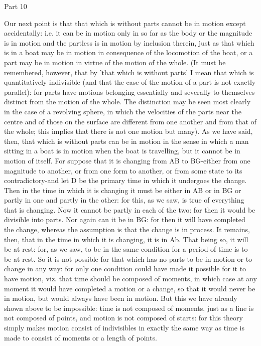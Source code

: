 Part 10

Our next point is that that which is without parts cannot be in motion
except accidentally: i.e. it can be in motion only in so far as the
body or the magnitude is in motion and the partless is in motion by
inclusion therein, just as that which is in a boat may be in motion
in consequence of the locomotion of the boat, or a part may be in
motion in virtue of the motion of the whole. (It must be remembered,
however, that by 'that which is without parts' I mean that which is
quantitatively indivisible (and that the case of the motion of a part
is not exactly parallel): for parts have motions belonging essentially
and severally to themselves distinct from the motion of the whole.
The distinction may be seen most clearly in the case of a revolving
sphere, in which the velocities of the parts near the centre and of
those on the surface are different from one another and from that
of the whole; this implies that there is not one motion but many).
As we have said, then, that which is without parts can be in motion
in the sense in which a man sitting in a boat is in motion when the
boat is travelling, but it cannot be in motion of itself. For suppose
that it is changing from AB to BG-either from one magnitude to another,
or from one form to another, or from some state to its contradictory-and
let D be the primary time in which it undergoes the change. Then in
the time in which it is changing it must be either in AB or in BG
or partly in one and partly in the other: for this, as we saw, is
true of everything that is changing. Now it cannot be partly in each
of the two: for then it would be divisible into parts. Nor again can
it be in BG: for then it will have completed the change, whereas the
assumption is that the change is in process. It remains, then, that
in the time in which it is changing, it is in Ab. That being so, it
will be at rest: for, as we saw, to be in the same condition for a
period of time is to be at rest. So it is not possible for that which
has no parts to be in motion or to change in any way: for only one
condition could have made it possible for it to have motion, viz.
that time should be composed of moments, in which case at any moment
it would have completed a motion or a change, so that it would never
be in motion, but would always have been in motion. But this we have
already shown above to be impossible: time is not composed of moments,
just as a line is not composed of points, and motion is not composed
of starts: for this theory simply makes motion consist of indivisibles
in exactly the same way as time is made to consist of moments or a
length of points. 

